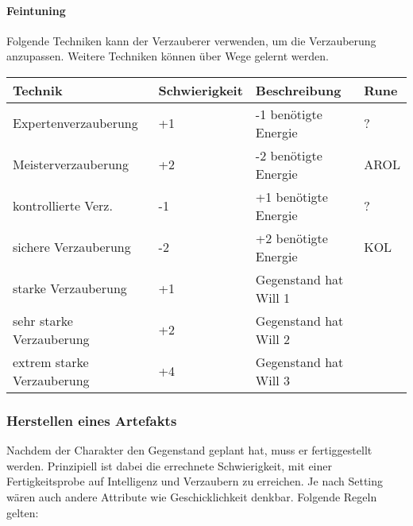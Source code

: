 \documentclass{article}
\begin{document}
\paragraph{Feintuning}

Folgende Techniken kann der Verzauberer verwenden, um die Verzauberung anzupassen. Weitere Techniken können über Wege
gelernt werden.


\begin{small}
\begin{tabular}{|m{4cm}|m{3cm}|m{4cm}|m{2cm}|}
\hline
\textbf{Technik}&\textbf{Schwierigkeit}&\textbf{Beschreibung}&\textbf{Rune}\\
\hline
\hline
Expertenverzauberung&+1&-1 benötigte Energie&?\\
\hline
Meisterverzauberung&+2&-2 benötigte Energie&AROL\\
\hline
kontrollierte Verz.&-1&+1 benötigte Energie&?\\
\hline
sichere Verzauberung&-2&+2 benötigte Energie&KOL\\
\hline
starke Verzauberung&+1&Gegenstand hat Will 1&\\
\hline
sehr starke Verzauberung&+2&Gegenstand hat Will 2&\\
\hline
extrem starke Verzauberung&+4&Gegenstand hat Will 3&\\
\hline
\end{tabular}
\end{small}

\subsubsection{Herstellen eines Artefakts}

Nachdem der Charakter den Gegenstand geplant hat, muss er fertiggestellt werden. Prinzipiell ist dabei die
errechnete Schwierigkeit, mit einer Fertigkeitsprobe auf Intelligenz und Verzaubern zu erreichen. Je nach Setting
wären auch andere Attribute wie Geschicklichkeit denkbar. Folgende Regeln gelten:
\end{document}
